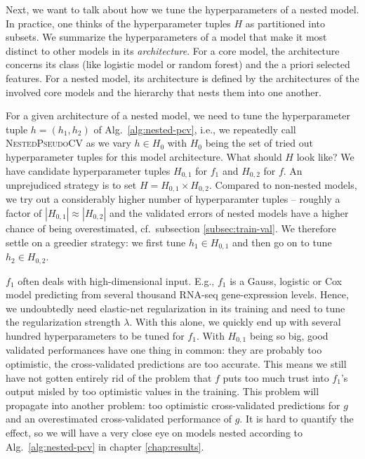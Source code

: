 Next, we want to talk about how we tune the hyperparameters of a nested model. In practice, one thinks of 
the hyperparameter tuples $H$ as partitioned into subsets. We summarize the
hyperparameters of a model that make it most distinct to other models in its \textit{architecture}. 
For a core model, the architecture concerns its class (like logistic model or random forest) and 
the a priori selected features. For a nested model, its architecture is defined by the architectures 
of the involved core models and the hierarchy that nests them into one another.

For a given architecture of a nested model, we need to tune the hyperparameter tuple $h = (h_1, h_2)$ 
of 
Alg.\ \ref{alg:nested-pcv}, i.e., we repeatedly call \textsc{NestedPseudoCV} as we vary $h \in H_0$
with $H_0$ being the set of tried out hyperparameter tuples for this model architecture. What 
should $H$ look like? We have candidate 
hyperparameter tuples $H_{0, 1}$ for $f_1$ and $H_{0, 2}$ for $f$. An unprejudiced strategy is to 
set $H = H_{0, 1} \times H_{0, 2}$. Compared to non-nested models, we try out a considerably 
higher number of hyperparamter tuples -- roughly a factor of $|H_{0, 1}| \approx |H_{0, 2}|$ and 
the validated errors of nested models have a higher chance 
of being overestimated, cf.\ subsection \ref{subsec:train-val}. We therefore settle on a greedier 
strategy: we first tune $h_1 \in H_{0, 1}$ and then go on to tune $h_2 \in H_{0, 2}$. 

$f_1$ often deals with high-dimensional input. E.g., $f_1$ is a Gauss, logistic or Cox model 
predicting from 
several thousand RNA-seq gene-expression levels. Hence, we undoubtedly need elastic-net 
regularization in its training and need to tune the regularization strength $\lambda$. 
With this alone, we quickly end up with several hundred hyperparameters to be tuned for $f_1$. 
With $H_{0,1}$ being so big, good validated performances have one thing in common: they are 
probably too optimistic, the cross-validated predictions are too accurate. This means we still 
have not gotten entirely rid of the problem that $f$ puts too much trust into $f_1$'s output 
misled by too optimistic values in the training. This problem will propagate into another
problem: too optimistic cross-validated predictions for $g$ and an overestimated 
cross-validated performance of $g$. It is hard to quantify the effect, so we will have a very close 
eye on models nested according to Alg.\ \ref{alg:nested-pcv} in chapter \ref{chap:results}. 

